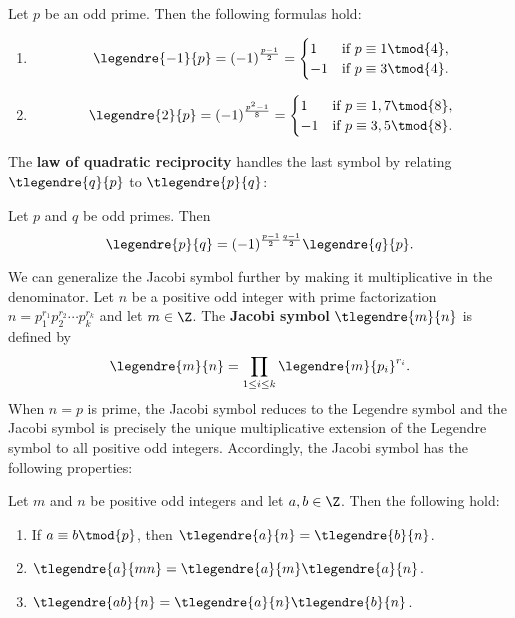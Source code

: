     \begin{proposition}
      Let $p$ be an odd prime. Then the following formulas hold:
      \begin{enumerate}[label=(\roman*)]
        \item
        \[
          \legendre{-1}{p} = (-1)^{\frac{p-1}{2}} = \begin{cases} 1 & \text{if $p \equiv 1 \tmod{4}$}, \\ -1 & \text{if $p \equiv 3 \tmod{4}$}. \end{cases}
        \]
        \item
        \[
          \legendre{2}{p} = (-1)^{\frac{p^{2}-1}{8}} = \begin{cases} 1 & \text{if $p \equiv 1,7 \tmod{8}$}, \\ -1 & \text{if $p \equiv 3,5 \tmod{8}$}. \end{cases}
        \]
      \end{enumerate}
    \end{proposition}
    The \textbf{law of quadratic reciprocity} handles the last symbol by relating $\tlegendre{q}{p}$ to $\tlegendre{p}{q}$:
    \begin{theorem}
      Let $p$ and $q$ be odd primes. Then
      \[
        \legendre{p}{q} = (-1)^{\frac{p-1}{2}\frac{q-1}{2}}\legendre{q}{p}.
      \]
    \end{theorem}
    We can generalize the Jacobi symbol further by making it multiplicative in the denominator. Let $n$ be a positive odd integer with prime factorization $n = p_{1}^{r_{1}}p_{2}^{r_{2}} \cdots p_{k}^{r_{k}}$ and let $m \in \Z$. The \textbf{Jacobi symbol} $\tlegendre{m}{n}$ is defined by
    \[
      \legendre{m}{n} = \prod_{1 \le i \le k}\legendre{m}{p_{i}}^{r_{i}}.
    \]
    When $n = p$ is prime, the Jacobi symbol reduces to the Legendre symbol and the Jacobi symbol is precisely the unique multiplicative extension of the Legendre symbol to all positive odd integers. Accordingly, the Jacobi symbol has the following properties:
    \begin{proposition}
      Let $m$ and $n$ be positive odd integers and let $a,b \in \Z$. Then the following hold:
      \begin{enumerate}[label=(\roman*)]
        \item If $a \equiv b \tmod{p}$, then $\tlegendre{a}{n} = \tlegendre{b}{n}$.
        \item $\tlegendre{a}{mn} = \tlegendre{a}{m}\tlegendre{a}{n}$.
        \item $\tlegendre{ab}{n} = \tlegendre{a}{n}\tlegendre{b}{n}$.
      \end{enumerate}
    \end{proposition}
